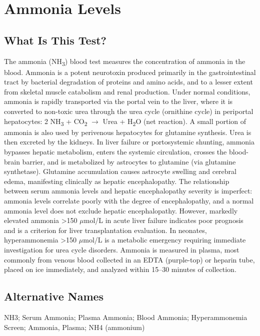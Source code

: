 \chapter{Ammonia Levels}

\section*{What Is This Test?}
The ammonia (NH\textsubscript{3}) blood test measures the concentration of ammonia in the blood. Ammonia is a potent neurotoxin produced primarily in the gastrointestinal tract by bacterial degradation of proteins and amino acids, and to a lesser extent from skeletal muscle catabolism and renal production. Under normal conditions, ammonia is rapidly transported via the portal vein to the liver, where it is converted to non-toxic urea through the urea cycle (ornithine cycle) in periportal hepatocytes: 2 NH\textsubscript{3} + CO\textsubscript{2} $\rightarrow$ Urea + H\textsubscript{2}O (net reaction). A small portion of ammonia is also used by perivenous hepatocytes for glutamine synthesis. Urea is then excreted by the kidneys. In liver failure or portosystemic shunting, ammonia bypasses hepatic metabolism, enters the systemic circulation, crosses the blood-brain barrier, and is metabolized by astrocytes to glutamine (via glutamine synthetase). Glutamine accumulation causes astrocyte swelling and cerebral edema, manifesting clinically as hepatic encephalopathy. The relationship between serum ammonia levels and hepatic encephalopathy severity is imperfect: ammonia levels correlate poorly with the degree of encephalopathy, and a normal ammonia level does not exclude hepatic encephalopathy. However, markedly elevated ammonia >150 $\mu$mol/L in acute liver failure indicates poor prognosis and is a criterion for liver transplantation evaluation. In neonates, hyperammonemia >150 $\mu$mol/L is a metabolic emergency requiring immediate investigation for urea cycle disorders. Ammonia is measured in plasma, most commonly from venous blood collected in an EDTA (purple-top) or heparin tube, placed on ice immediately, and analyzed within 15--30 minutes of collection.

\section*{Alternative Names}
NH3; Serum Ammonia; Plasma Ammonia; Blood Ammonia; Hyperammonemia Screen; Ammonia, Plasma; NH4 (ammonium)

